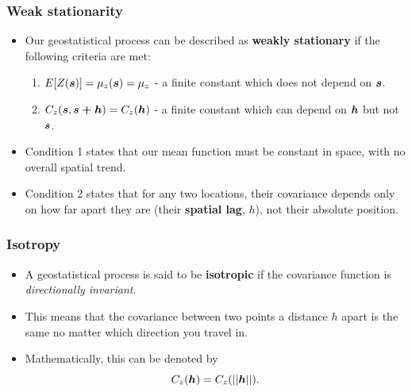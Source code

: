 \documentclass[parskip,12pt]{beamer}
\newcommand{\bd}[1]{\ensuremath{\mbox{\boldmath $#1$}}}
\begin{document}
\begin{frame}
\frametitle{Weak stationarity}
 \begin{itemize}
\item Our geostatistical process can be described as \textbf{weakly stationary} if the following criteria are met:
\vspace{2mm}
\begin{enumerate}
\item $E[{Z(\bd{s})}] = \mu_z(\bd{s}) = \mu_z$ - a finite constant which does not depend on $\bd{s}$.
\vspace{2mm}
\item $C_z(\bd{s}, \bd{s+h}) = C_z(\bd{h})$ - a finite constant which can depend on $\bd{h}$ but not $\bd{s}$.
\end{enumerate}
\vspace{2mm}
\item Condition 1 states that our mean function must be constant in space, with no overall spatial trend.
\vspace{3mm}
\item Condition 2 states that for any two locations, their covariance depends only on how far apart they are (their \textbf{spatial lag}, $h$), not their absolute position.
\end{itemize}
\end{frame}


\begin{frame}
\frametitle{Isotropy}
 \begin{itemize}
\item A geostatistical process is said to be \textbf{isotropic} if the covariance function is \emph{directionally invariant}.
\vspace{3mm}
\item This means that the covariance between two points a distance $h$ apart is the same no matter which direction you travel in.
\vspace{3mm}
\item Mathematically, this can be denoted by $$C_z(\bd{h}) = C_z(||\bd{h}||).$$
\end{itemize}
\end{frame}
\end{document}

